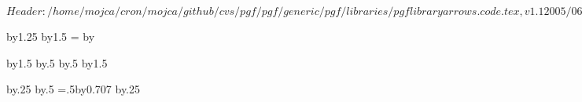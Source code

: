\ProvidesPackageRCS $Header: /home/mojca/cron/mojca/github/cvs/pgf/pgf/generic/pgf/libraries/pgflibraryarrows.code.tex,v 1.1 2005/06/29 12:14:04 tantau Exp $

%



\pgfarrowsdeclare{[}{]}
{
  \@tempdima=1pt%
  \advance\@tempdima by1.25\pgflinewidth%
  \pgfarrowsleftextend{-\@tempdima}
  \pgfarrowsrightextend{.5\pgflinewidth}
}
{
  \@tempdima=2pt%
  \advance\@tempdima by1.5\pgflinewidth%
  \@tempdimb=\@tempdima%
  \advance\@tempdimb by\pgflinewidth%
  \pgfsetdash{}{0pt}
  \pgfsetmiterjoin
  \pgfsetbuttcap
  \pgfpathlineto{\pgfpoint{0pt}{-\@tempdima}}
  \pgfpathlineto{\pgfpoint{0pt}{\@tempdima}}
  \pgfusepathqstroke
}

\pgfarrowsdeclarereversed{]}{[}{[}{]}



\pgfarrowsdeclare{(}{)}
{
  \@tempdima=2pt%
  \advance\@tempdima by1.5\pgflinewidth%
  \@tempdima\advance\@tempdimb by.5\pgflinewidth%
  \pgfarrowsrightextend{\@tempdimb}
  \@tempdima\advance\@tempdimb by.5\pgflinewidth%
  \pgfarrowsleftextend{-\@tempdimb}
}
{
  \@tempdima=2pt%
  \advance\@tempdima by1.5\pgflinewidth%
  \pgfsetdash{}{0pt}
  \pgfsetroundcap
  \pgfpathcurveto
  {}
  {}
  {}
  \pgfusepathqstroke
}

\pgfarrowsdeclarereversed{)}{(}{(}{)}





{
  \@tempdima=0.3pt%
  \advance\@tempdima by.25\pgflinewidth%
  \@tempdima\advance\@tempdimb by.5\pgflinewidth%
  \pgfarrowsleftextend{-\@tempdimb}
  \@tempdimb=.5\@tempdima\advance\@tempdimb by0.707\pgflinewidth%
  \pgfarrowsrightextend{\@tempdimb}
}
{
  \@tempdima=0.3pt%
  \advance\@tempdima by.25\pgflinewidth%
  \pgfsetdash{}{0pt}
  \pgfsetroundcap
  \pgfsetmiterjoin
  \pgfusepathqstroke
}

